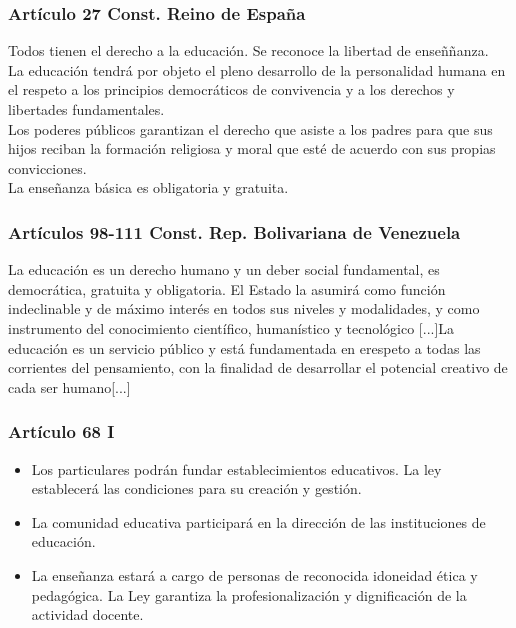 \documentclass{beamer}
\begin{document}
\begin{frame}
\frametitle{Art\'iculo 27 Const. Reino de Espa\~na}
Todos tienen el derecho a la educaci\'on. Se reconoce la libertad de enseñ\~nanza. \\
La educaci\'on tendr\'a por objeto el pleno desarrollo de la personalidad humana en el respeto a los principios democr\'aticos de convivencia y a los derechos y libertades
fundamentales.\\
Los poderes p\'ublicos garantizan el derecho que asiste a los padres para que sus hijos reciban la formación religiosa y moral que est\'e de acuerdo con sus propias convicciones.\\
La ense\~nanza b\'asica es obligatoria y gratuita. 
\end{frame}
\begin{frame}
\frametitle{Art\'iculos 98-111 Const. Rep. Bolivariana de Venezuela}
La educaci\'on es un derecho humano y un deber social fundamental, es democr\'atica, gratuita y obligatoria.
El Estado la asumir\'a como funci\'on indeclinable y de m\'aximo inter\'es en todos sus niveles y modalidades, y como instrumento del conocimiento cient\'ifico, human\'istico y tecnol\'ogico [...]La educaci\'on es un servicio p\'ublico y est\'a fundamentada en erespeto a todas las corrientes del pensamiento, con la finalidad de desarrollar
el potencial creativo de cada ser humano[...]
\end{frame}
\begin{frame}
\frametitle{Art\'iculo 68 I}\begin{itemize}
\item Los particulares podr\'an fundar establecimientos educativos. La ley establecer\'a las condiciones para su creaci\'on y gesti\'on.\\
\item La comunidad educativa participar\'a en la direcci\'on de las instituciones de educaci\'on.\\
\item La enseñanza estar\'a a cargo de personas de reconocida idoneidad \'etica y pedag\'ogica. La Ley garantiza la profesionalizaci\'on y dignificaci\'on de la actividad docente. 
\end{itemize}
\end{frame}
\end{document}
